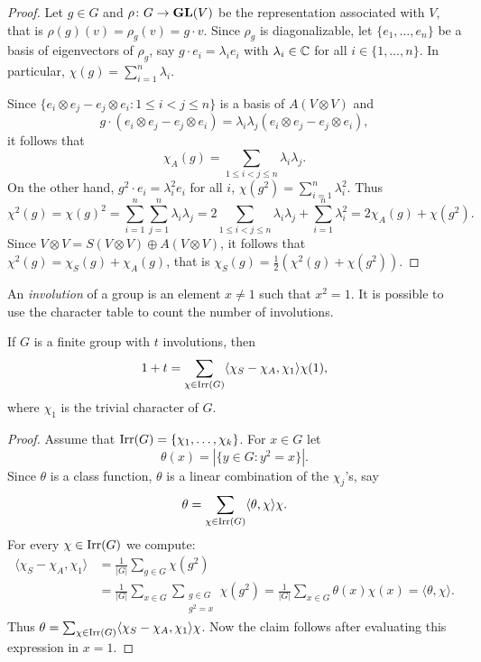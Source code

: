 \begin{proof}
    Let $g\in G$ and $\rho\colon G\to\mathbf{GL}(V)$ be the representation
    associated with $V$, that is $\rho(g)(v)=\rho_g(v)=g\cdot v$. 
    Since $\rho_g$ is diagonalizable, let $\{e_1,\dots,e_n\}$ 
    be a basis of eigenvectors of $\rho_g$, say
    $g\cdot e_i=\lambda_ie_i$ with $\lambda_i\in\mathbb{C}$ for all $i\in\{1,\dots,n\}$. In particular, $\chi(g)=\sum_{i=1}^n\lambda_i$. 
    
    Since $\{e_i\otimes e_j-e_j\otimes e_i:1\leq i<j\leq n\}$ is a basis of
    $A(V\otimes V)$ and 
    \[
    g\cdot (e_i\otimes e_j-e_j\otimes e_i)=\lambda_i\lambda_j(e_i\otimes e_j-e_j\otimes e_i),
    \]
    it follows that
    \[
    \chi_A(g)=\sum_{1\leq i<j\leq n}\lambda_i\lambda_j.
    \]
    On the other hand,
    $g^2\cdot e_i=\lambda_i^2e_i$ for all $i$,
    $\chi(g^2)=\sum_{i=1}^n\lambda_i^2$. Thus 
    \[
    \chi^2(g)=\chi(g)^2=\sum_{i=1}^n\sum_{j=1}^n\lambda_i\lambda_j=2\sum_{1\leq i<j\leq n}\lambda_i\lambda_j+\sum_{i=1}^n\lambda_i^2=2\chi_A(g)+\chi(g^2).
    \]
    Since $V\otimes V=S(V\otimes V)\oplus A(V\otimes V)$, it follows that  
    $\chi^2(g)=\chi_S(g)+\chi_A(g)$, that is 
    $\chi_S(g)=\frac12(\chi^2(g)+\chi(g^2))$.
\end{proof}

An \emph{involution} of a group is an element $x\ne 1$ such that $x^2=1$. 
It is possible to use the character table to count the number
of involutions.

\begin{proposition}
\label{pro:involutions}
    If $G$ is a finite group with $t$ involutions, then
    \[
        1+t=\sum_{\chi\in\operatorname{Irr}(G)}\langle\chi_S-\chi_A,\chi_1\rangle\chi(1),
    \]
    where $\chi_1$ is 
    the trivial character of $G$.
\end{proposition}

\begin{proof}
    Assume that $\operatorname{Irr}(G)=\{\chi_1,\dots,\chi_k\}$.  
    For $x\in G$ let 
    \[
    \theta(x)=|\{y\in G:y^2=x\}|.
    \]
    Since $\theta$ is a class function, 
    $\theta$ is a linear combination of the $\chi_j$'s, say 
    \[
    \theta=\sum_{\chi\in\operatorname{Irr}(G)}\langle\theta,\chi\rangle\chi.
    \]
    For every $\chi\in\operatorname{Irr}(G)$ we compute: 
    \begin{align*}
        \langle\chi_S-\chi_A,\chi_1\rangle 
        &=\frac{1}{|G|}\sum_{g\in G}\chi(g^2)\\
        &=\frac{1}{|G|}\sum_{x\in G}\sum_{\substack{g\in G\\g^2=x}}\chi(g^2)
        =\frac{1}{|G|}\sum_{x\in G}\theta(x)\chi(x)=\langle\theta,\chi\rangle.
    \end{align*}
    Thus $\theta=\sum_{\chi\in\operatorname{Irr}(G)}\langle\chi_S-\chi_A,\chi_1\rangle\chi$. Now
    the claim follows after evaluating this expression in 
    $x=1$. 
\end{proof}

